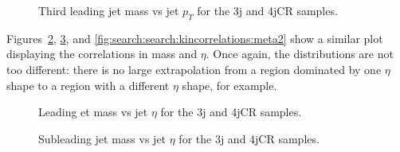 \begin{figure}[!ht]
  \centering
  

    
  \caption{Third leading jet mass vs jet $p_T$ for the 3j and 4jCR samples.}
           
  \label{fig:search:search:kincorrelations:mpt2}
\end{figure}


Figures~\ref{fig:search:search:kincorrelations:meta0}, \ref{fig:search:search:kincorrelations:meta1}, and \ref{fig:search:search:kincorrelations:meta2} show a similar plot displaying the correlations in mass and $\eta$. Once again, the distributions are not too different: there is no large extrapolation from a region dominated by one $\eta$ shape to a region with a different $\eta$ shape, for example.

\begin{figure}[!ht]
  \centering
  

    
  \caption{Leading et mass vs jet $\eta$ for the 3j and 4jCR samples.}
           
  \label{fig:search:search:kincorrelations:meta0}
\end{figure}

\begin{figure}[!ht]
  \centering
  

    
  \caption{Subleading jet mass vs jet $\eta$ for the 3j and 4jCR samples.}
           
  \label{fig:search:search:kincorrelations:meta1}
\end{figure}


